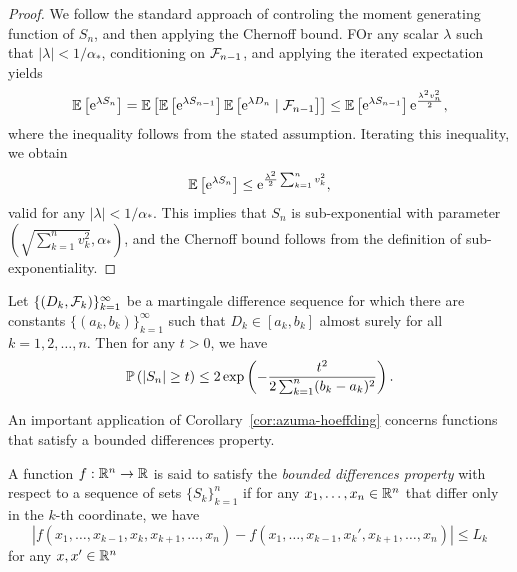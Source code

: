 \begin{proof}
	We follow the standard approach of controling the moment generating function of \(S_{n}\), and then applying the Chernoff bound. FOr any scalar \(\lambda\) such that \(|\lambda|<1/\alpha_{*}\), conditioning on \(\mathcal{F}_{n-1}\), and applying the iterated expectation yields
	\begin{equation*}
		\mathbb{E}\left[\mathrm{e}^{\lambda S_{n}}\right]=\mathbb{E}\left[\mathbb{E}\left[\mathrm{e}^{\lambda S_{n-1}}\right]\mathbb{E}\left[\mathrm{e}^{\lambda D_{n}}\mid \mathcal{F}_{n-1}\right]\right]\leq \mathbb{E}\left[\mathrm{e}^{\lambda S_{n-1}}\right]\mathrm{e}^{\frac{\lambda^{2}v_{n}^{2}}{2}},
	\end{equation*}
	where the inequality follows from the stated assumption. Iterating this inequality, we obtain
	\begin{equation*}
		\mathbb{E}\left[\mathrm{e}^{\lambda S_{n}}\right]\leq\mathrm{e}^{\frac{\lambda^{2}}{2}\sum_{k=1}^{n}v_{k}^{2}},
	\end{equation*}
	valid for any \(|\lambda|<1/\alpha_{*}\). This implies that \(S_{n}\) is sub-exponential with parameter \((\sqrt{\sum_{k=1}^{n}v_{k}^{2}},\alpha_{*})\), and the Chernoff bound follows from the definition of sub-exponentiality.
\end{proof}

\begin{corollary}\label{cor:azuma-hoeffding}
	Let \(\{(D_{k},\mathcal{F}_{k})\}_{k=1}^{\infty}\) be a martingale difference sequence for which there are constants \(\{(a_{k},b_{k})\}_{k=1}^{\infty}\) such that \(D_{k}\in[a_{k},b_{k}]\) almost surely for all \(k=1,2,\ldots,n\). Then for any \(t>0\), we have
	\begin{equation*}
		\mathbb{P}\left(\left|S_{n}\right|\geq t\right)\leq 2\exp\left(-\frac{t^{2}}{2\sum_{k=1}^{n}(b_{k}-a_{k})^{2}}\right).
	\end{equation*}
\end{corollary}

An important application of Corollary~\ref{cor:azuma-hoeffding} concerns functions that satisfy a bounded differences property.

\begin{definition}
	A function \(f:\mathbb{R}^{n}\to\mathbb{R}\) is said to satisfy the \textit{bounded differences property} with respect to a sequence of sets \(\{S_{k}\}_{k=1}^{n}\) if for any \(x_{1},\ldots,x_{n}\in\mathbb{R}^{n}\) that differ only in the \(k\)-th coordinate, we have
	\begin{equation*}
		\left|f(x_{1},\ldots,x_{k-1},x_{k},x_{k+1},\ldots,x_{n})-f(x_{1},\ldots,x_{k-1},x_{k}',x_{k+1},\ldots,x_{n})\right|\leq L_{k}
	\end{equation*}
	for any \(x,x'\in\mathbb{R}^{n}\)
\end{definition}

